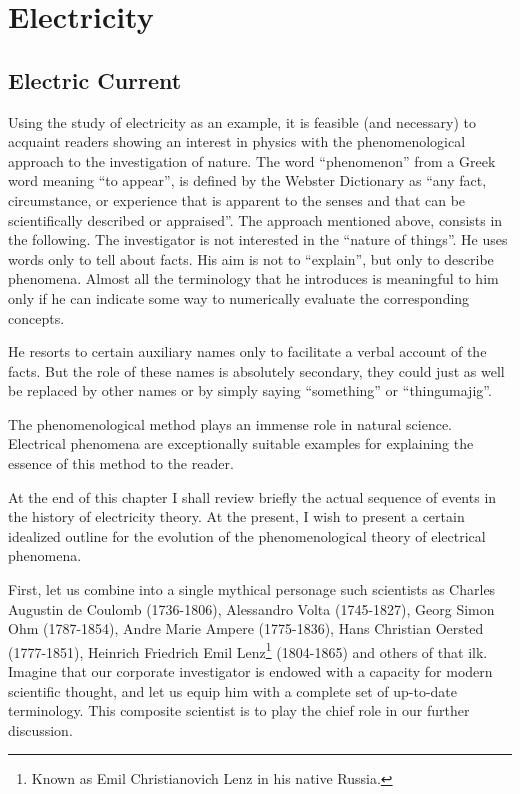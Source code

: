 

\cleardoublepage
\chapter{Electricity}
\label{ch-01}
\section{Electric Current}

Using the study of electricity as an example, it is feasible (and necessary) to acquaint readers showing an interest in physics with the phenomenological approach to the investigation of nature. The word ``phenomenon'' from a Greek word meaning ``to appear'', is defined by the Webster Dictionary as ``any fact, circumstance, or experience that is apparent to the senses and that can be scientifically described or appraised''. The approach mentioned above, consists in the following. The investigator is not interested in the ``nature of things''. He uses words only to tell about facts. His aim is not to ``explain'', but only to describe phenomena. Almost all the terminology that he introduces is meaningful to him only if he can indicate some way to numerically evaluate the corresponding concepts.

He resorts to certain auxiliary names only to facilitate a verbal account of the facts. But the role of these names is absolutely secondary, they could just as well be replaced by other names or by simply saying ``something'' or ``thingumajig''.

The phenomenological method plays an immense role in natural science. Electrical phenomena are exceptionally suitable examples for explaining the essence of this method to the reader.

At the end of this chapter I shall review briefly the actual sequence of events in the history of electricity theory. At the present, I wish to present a certain idealized outline for the evolution of the phenomenological theory of electrical phenomena.

First, let us combine into a single mythical personage such scientists as Charles Augustin de Coulomb (1736-1806), Alessandro Volta (1745-1827), Georg Simon Ohm (1787-1854), Andre Marie Ampere (1775-1836), Hans Christian Oersted (1777-1851), Heinrich Friedrich Emil Lenz\footnote{Known as Emil Christianovich Lenz in his native Russia.} (1804-1865) and others of that ilk. Imagine that our corporate investigator is endowed with a capacity for modern scientific thought, and let us equip him with a complete set of up-to-date terminology. This composite scientist is to play the chief role in our further discussion.

